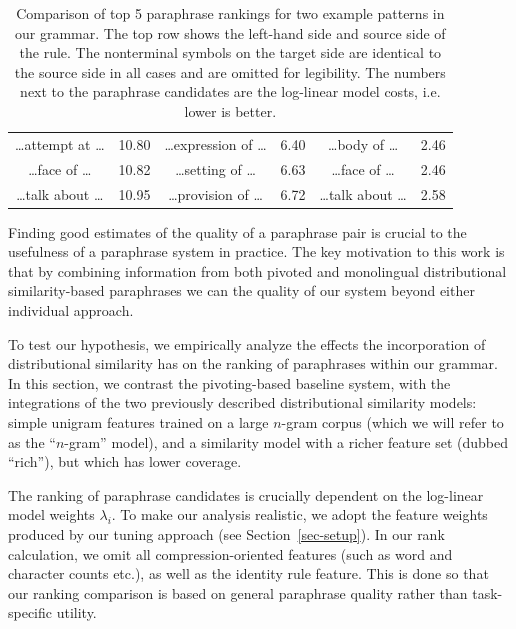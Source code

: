 \documentclass[11pt]{article}
\begin{document}
\begin{table}[!t]
\begin{center}
\begin{tabular}{|cr|cr|cr|}
  \ldots attempt at \ldots & 10.80 &
  \ldots expression of \ldots & 6.40 &
  \ldots body of \ldots & 2.46 \\


  \ldots face of \ldots & 10.82 &
  \ldots setting of \ldots & 6.63 &
  \ldots face of \ldots & 2.46 \\

  \ldots talk about \ldots & 10.95 &
  \ldots provision of \ldots & 6.72 &
  \ldots talk about \ldots & 2.58 \\

  \hline
\end{tabular}
\end{center}
\normalsize
\caption{Comparison of top 5 paraphrase rankings for two example patterns in
  our grammar. The top row shows the left-hand side and source side of
  the rule. The nonterminal symbols on the target side are identical
  to the source side in all cases and are omitted for legibility. The
  numbers next to the paraphrase candidates are the log-linear model
  costs, i.e. lower is better.}
\label{tab-ranking}
\end{table}

Finding good estimates of the quality of a paraphrase pair is crucial
to the usefulness of a paraphrase system in practice. The key
motivation to this work is that by combining information from both
pivoted and monolingual distributional similarity-based paraphrases we
can the quality of our system beyond either individual approach.

To test our hypothesis, we empirically analyze the effects the
incorporation of distributional similarity has on the ranking of
paraphrases within our grammar. In this section, we contrast the
pivoting-based baseline system, with the integrations of the two
previously described distributional similarity models: simple unigram
features trained on a large $n$-gram corpus (which we will refer to as
the ``$n$-gram'' model), and a similarity model with a richer feature
set (dubbed ``rich''), but which has lower coverage.

The ranking of paraphrase candidates is crucially dependent on the
log-linear model weights $\lambda_i$. To make our analysis realistic,
we adopt the feature weights produced by our tuning approach (see
Section~\ref{sec-setup}). In our rank calculation, we omit all
compression-oriented features (such as word and character counts
etc.), as well as the identity rule feature. This is done so that our
ranking comparison is based on general paraphrase quality rather than
task-specific utility.
\end{document}
